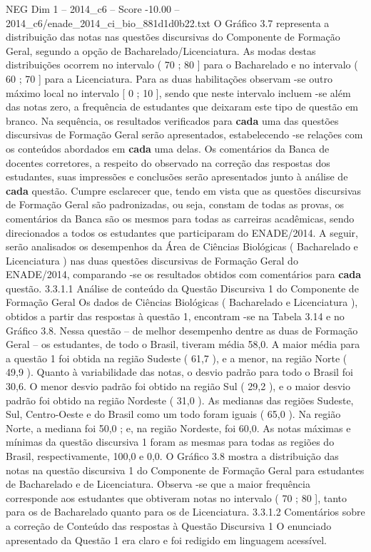 \begin{textsample}{NEG Dim 1 – 2014\_c6 – Score -10.00 – 2014\_c6/enade\_2014\_ci\_bio\_881d1d0b22.txt}
O Gráfico 3.7 representa a distribuição das notas nas questões discursivas do Componente de Formação Geral, segundo a opção de Bacharelado/Licenciatura.
As modas destas distribuições ocorrem no intervalo ( 70 ; 80 ] para o Bacharelado e no intervalo ( 60 ; 70 ] para a Licenciatura.
Para as duas habilitações observam -se outro máximo local no intervalo [ 0 ; 10 ], sendo que neste intervalo incluem -se além das notas zero, a frequência de estudantes que deixaram este tipo de questão em branco.
Na sequência, os resultados verificados para \textbf{cada} uma das questões discursivas de Formação Geral serão apresentados, estabelecendo -se relações com os conteúdos abordados em \textbf{cada} uma delas.
Os comentários da Banca de docentes corretores, a respeito do observado na correção das respostas dos estudantes, suas impressões e conclusões serão apresentados junto à análise de \textbf{cada} questão.
Cumpre esclarecer que, tendo em vista que as questões discursivas de Formação Geral são padronizadas, ou seja, constam de todas as provas, os comentários da Banca são os mesmos para todas as carreiras acadêmicas, sendo direcionados a todos os estudantes que participaram do ENADE/2014.
A seguir, serão analisados os desempenhos da Área de Ciências Biológicas ( Bacharelado e Licenciatura ) nas duas questões discursivas de Formação Geral do ENADE/2014, comparando -se os resultados obtidos com comentários para \textbf{cada} questão. 3.3.1.1 Análise de conteúdo da Questão Discursiva 1 do Componente de Formação Geral Os dados de Ciências Biológicas ( Bacharelado e Licenciatura ), obtidos a partir das respostas à questão 1, encontram -se na Tabela 3.14 e no Gráfico 3.8.
Nessa questão – de melhor desempenho dentre as duas de Formação Geral – os estudantes, de todo o Brasil, tiveram média 58,0.
A maior média para a questão 1 foi obtida na região Sudeste ( 61,7 ), e a menor, na região Norte ( 49,9 ).
Quanto à variabilidade das notas, o desvio padrão para todo o Brasil foi 30,6.
O menor desvio padrão foi obtido na região Sul ( 29,2 ), e o maior desvio padrão foi obtido na região Nordeste ( 31,0 ).
As medianas das regiões Sudeste, Sul, Centro-Oeste e do Brasil como um todo foram iguais ( 65,0 ).
Na região Norte, a mediana foi 50,0 ; e, na região Nordeste, foi 60,0.
As notas máximas e mínimas da questão discursiva 1 foram as mesmas para todas as regiões do Brasil, respectivamente, 100,0 e 0,0.
O Gráfico 3.8 mostra a distribuição das notas na questão discursiva 1 do Componente de Formação Geral para estudantes de Bacharelado e de Licenciatura.
Observa -se que a maior frequência corresponde aos estudantes que obtiveram notas no intervalo ( 70 ; 80 ], tanto para os de Bacharelado quanto para os de Licenciatura. 3.3.1.2 Comentários sobre a correção de Conteúdo das respostas à Questão Discursiva 1 O enunciado apresentado da Questão 1 era claro e foi redigido em linguagem acessível.

\end{textsample}
